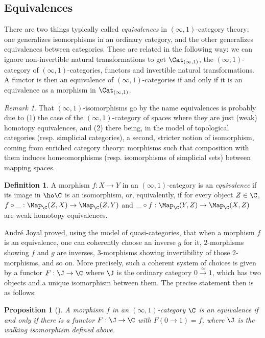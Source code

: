 \documentclass{conm-p-l}
\newtheorem{proposition}[theorem]{Proposition}
\theoremstyle{definition} \newtheorem{definition}[theorem]{Definition}
\theoremstyle{remark} \newtheorem{remark}[theorem]{Remark}
\numberwithin{equation}{section}
\newcommand{\oo}{\infty}
\newcommand{\io}{$(\oo,1)$}
\newcommand{\Catio}{\Cat_{(\oo,1)}}
\begin{document}
\subsection{Equivalences}

There are two things typically called \emph{equivalences} in
\io-category theory: one generalizes isomorphisms in an ordinary
category, and the other generalizes equivalences between categories.
These are related in the following way: we can ignore
non-invertible natural transformations to get $\Catio$, the
\io-category of \io-categories, functors and invertible natural
transformations. A functor is then an equivalence of \io-categories
if and only if it is an equivalence as a morphism in $\Catio$.

\begin{remark}
  That \io-isomorphisms go by the name equivalences is probably due
  to (1) the case of the \io-category of spaces where they are just
  (weak) homotopy equivalences, and (2) there being, in the model of
  topological categories (resp. simplicial categories), a second, stricter
  notion of isomorphism, coming from enriched category theory:
  morphisms such that composition with them induces homeomorphisms
  (resp. isomorphisms of simplicial sets) between mapping spaces.
\end{remark}

\begin{definition}
  A morphism $f : X \to Y$ in an \io-category is an \emph{equivalence}
  if its image in $\ho\C$ is an isomorphism, or, equivalently, if for
  every object $Z \in \C$, $f \circ \_ : \Map_\C(Z,X) \to \Map_\C(Z,Y)$
  and $\_ \circ f : \Map_\C(Y,Z) \to \Map_\C(X,Z)$ are weak homotopy
  equivalences.
\end{definition}

Andr\'{e} Joyal proved, using the model of quasi-categories, that when
a morphism $f$ is an equivalence, one can coherently choose an inverse
$g$ for it, $2$-morphisms showing $f$ and $g$ are inverses, $3$-morphisms
showing invertibility of those $2$-morphisms, and so on. More precisely,
such a coherent system of choices is given by a functor $F : \J \to \C$
where $\J$ is the ordinary category $0 \xrightarrow{\simeq} 1$,
which has two objects and a unique isomorphism between them. The precise
statement then is as follows:

\begin{proposition}[{\cite[Corollary 1.6]{JoyalPub}}]
  A morphism $f$ in an \io-category $\C$ is an equivalence if and only
  if there is a functor $F : \J \to \C$ with $F(0 \to 1) = f$, where
  $\J$ is the \emph{walking isomorphism} defined above.
\end{proposition}
\end{document}
